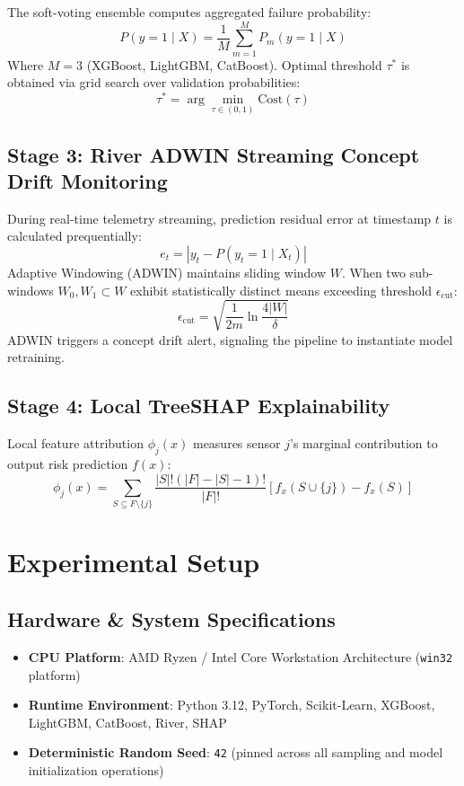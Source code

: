 \documentclass[conference]{IEEEtran}
\begin{document}
The soft-voting ensemble computes aggregated failure probability:
\begin{equation}
P(y=1 \mid X) = \frac{1}{M} \sum_{m=1}^{M} P_m(y=1 \mid X)
\end{equation}
Where $M=3$ (XGBoost, LightGBM, CatBoost). Optimal threshold $\tau^*$ is obtained via grid search over validation probabilities:
\begin{equation}
\tau^* = \arg\min_{\tau \in (0,1)} \text{Cost}(\tau)
\end{equation}

\subsection{Stage 3: River ADWIN Streaming Concept Drift Monitoring}
During real-time telemetry streaming, prediction residual error at timestamp $t$ is calculated prequentially:
\begin{equation}
e_t = | y_t - P(y_t=1 \mid X_t) |
\end{equation}
Adaptive Windowing (ADWIN) maintains sliding window $W$. When two sub-windows $W_0, W_1 \subset W$ exhibit statistically distinct means exceeding threshold $\epsilon_{\text{cut}}$:
\begin{equation}
\epsilon_{\text{cut}} = \sqrt{\frac{1}{2m} \ln \frac{4 |W|}{\delta}}
\end{equation}
ADWIN triggers a concept drift alert, signaling the pipeline to instantiate model retraining.

\subsection{Stage 4: Local TreeSHAP Explainability}
Local feature attribution $\phi_j(x)$ measures sensor $j$'s marginal contribution to output risk prediction $f(x)$:
\begin{equation}
\phi_j(x) = \sum_{S \subseteq F \setminus \{j\}} \frac{|S|! (|F| - |S| - 1)!}{|F|!} \left[ f_x(S \cup \{j\}) - f_x(S) \right]
\end{equation}

\section{Experimental Setup}

\subsection{Hardware \& System Specifications}
\begin{itemize}
    \item \textbf{CPU Platform}: AMD Ryzen / Intel Core Workstation Architecture (\texttt{win32} platform)
    \item \textbf{Runtime Environment}: Python 3.12, PyTorch, Scikit-Learn, XGBoost, LightGBM, CatBoost, River, SHAP
    \item \textbf{Deterministic Random Seed}: \texttt{42} (pinned across all sampling and model initialization operations)
\end{itemize}
\end{document}
